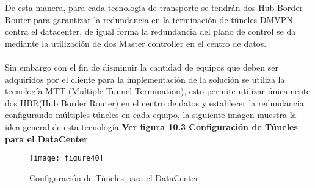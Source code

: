 De esta manera, para cada tecnología de transporte se tendrán dos Hub Border Router para garantizar la redundancia en la terminación de túneles DMVPN contra el datacenter, de igual forma la redundancia del plano de control se da mediante la utilización de dos Master controller en el centro de datos.
\\
\\
Sin embargo con el fin de disminuir la cantidad de equipos que deben ser adquiridos por el cliente para la implementación de la solución se utiliza la tecnología MTT (Multiple Tunnel Termination), esto permite utilizar únicamente dos HBR(Hub Border Router) en el centro de datos y establecer la redundancia configurando múltiples túneles en cada equipo, la siguiente imagen muestra la idea general de esta tecnología \textbf{Ver figura 10.3 Configuración de Túneles para el DataCenter}.

\begin{figure}[htbp]
  \centering
    {\texttt{[image: figure40]}}%
  \caption{Configuración de Túneles para el DataCenter}
  \label{fig:fig2subfig}
\end{figure}

